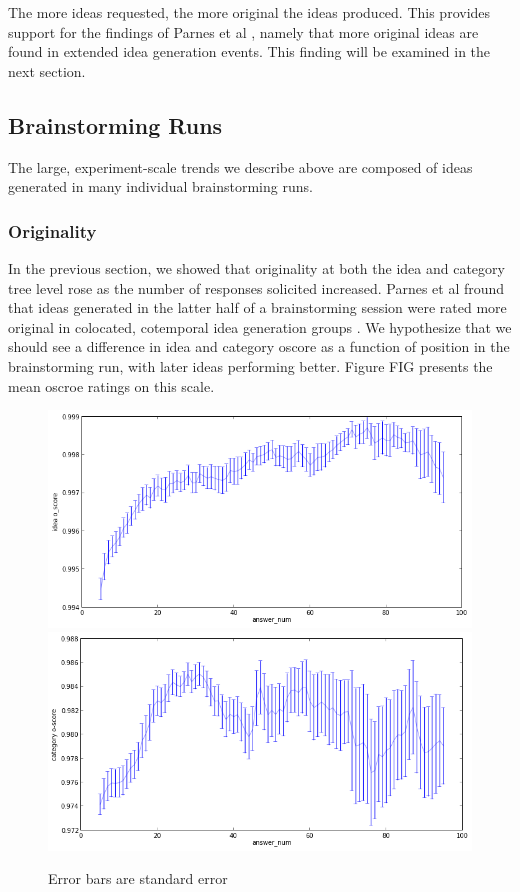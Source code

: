 The more ideas requested, the more original the ideas produced. This provides support for the findings of Parnes et al \cite{parnes_effects_1961}, namely that more original ideas are found in extended idea generation events. This finding will be examined in the next section.




\subsection{Brainstorming Runs}

The large, experiment-scale trends we describe above are composed of ideas generated in many individual brainstorming runs.

\subsubsection{Originality}

In the previous section, we showed that originality at both the idea and category tree level rose as the number of responses solicited increased. Parnes et al fround that ideas generated in the latter half of a brainstorming session were rated more original in colocated, cotemporal idea generation groups \cite{parnes_effects_1961}. We hypothesize that we should see a difference in idea and category oscore as a function of position in the brainstorming run, with later ideas performing better. Figure FIG presents the mean oscroe ratings on this scale.

\begin{figure}[h]
    \centering
    \includegraphics[width=0.9\columnwidth]{run_idea_oscore}
    \includegraphics[width=0.9\columnwidth]{run_category_oscore}
    \caption{Error bars are standard error}
\end{figure}

